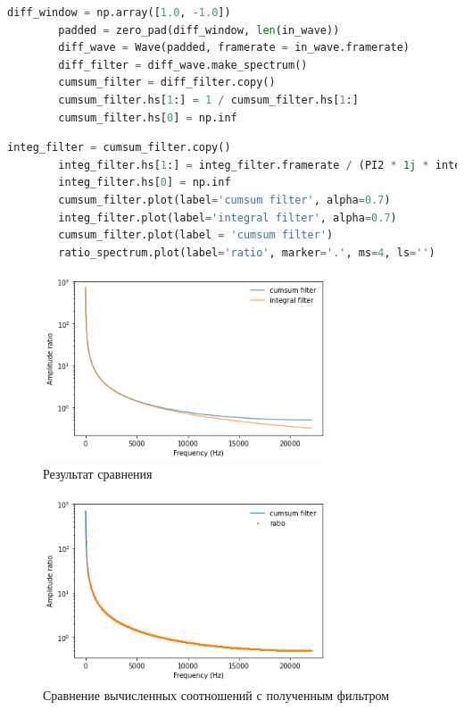 \documentclass[a4paper, 12pt]{report}
\begin{document}
	\begin{lstlisting}[language=Python,caption=Получение фильтра для суммирования]
		diff_window = np.array([1.0, -1.0])
		padded = zero_pad(diff_window, len(in_wave))
		diff_wave = Wave(padded, framerate = in_wave.framerate)
		diff_filter = diff_wave.make_spectrum()
		cumsum_filter = diff_filter.copy()
		cumsum_filter.hs[1:] = 1 / cumsum_filter.hs[1:]
		cumsum_filter.hs[0] = np.inf
	\end{lstlisting}
	\begin{lstlisting}[language=Python,caption=Сравнение суммирования и интегрирования]
		integ_filter = cumsum_filter.copy()
		integ_filter.hs[1:] = integ_filter.framerate / (PI2 * 1j * integ_filter.fs[1:])
		integ_filter.hs[0] = np.inf
		cumsum_filter.plot(label='cumsum filter', alpha=0.7)
		integ_filter.plot(label='integral filter', alpha=0.7)
		cumsum_filter.plot(label = 'cumsum filter')
		ratio_spectrum.plot(label='ratio', marker='.', ms=4, ls='')
	\end{lstlisting}
	\begin{figure}[H]
		\centering
		\includegraphics[width=0.75\textwidth]{sum6.png}
		\caption{Результат сравнения}
		\label{fig:sum6}
	\end{figure}
	\begin{figure}[H]
		\centering
		\includegraphics[width=0.75\textwidth]{sum7.png}
		\caption{Сравнение вычисленных соотношений с полученным фильтром}
		\label{fig:sum7}
	\end{figure}
\end{document}
